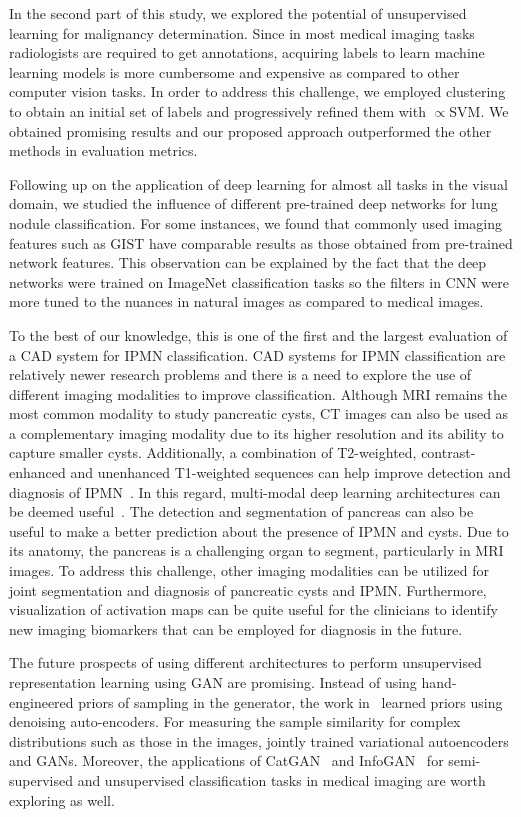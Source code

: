 \documentclass[journal]{IEEEtran}
\begin{document}
In the second part of this study, we explored the potential of unsupervised learning for malignancy determination. Since in most medical imaging tasks radiologists are required to get annotations, acquiring labels to learn machine learning models is more cumbersome and expensive as compared to other computer vision tasks. In order to address this challenge, we employed clustering to obtain an initial set of labels and progressively refined them with $\propto$SVM. We obtained promising results and our proposed approach outperformed the other methods in evaluation metrics.

Following up on the application of deep learning for almost all tasks in the visual domain, we studied the influence of different pre-trained deep networks for lung nodule classification. For some instances, we found that commonly used imaging features such as GIST have comparable results as those obtained from pre-trained network features. This observation can be explained by the fact that the deep networks were trained on ImageNet classification tasks so the filters in CNN were more tuned to the nuances in natural images as compared to medical images.

To the best of our knowledge, this is one of the first and the largest evaluation of a CAD system for IPMN classification. CAD systems for IPMN classification are relatively newer research problems and there is a need to explore the use of different imaging modalities to improve classification. Although MRI remains the most common modality to study pancreatic cysts, CT images can also be used as a complementary imaging modality due to its higher resolution and its ability to capture smaller cysts. Additionally, a combination of T2-weighted, contrast-enhanced and unenhanced T1-weighted sequences can help improve detection and diagnosis of IPMN~\cite{kalb2009mr}. In this regard, multi-modal deep learning architectures can be deemed useful~\cite{ma2015multimodal}.
The detection and segmentation of pancreas can also be useful to make a better prediction about the presence of IPMN and cysts. Due to its anatomy, the pancreas is a challenging
organ to segment, particularly in MRI images. To address this challenge, other imaging modalities can be utilized for joint segmentation and diagnosis of pancreatic cysts and IPMN. Furthermore, visualization of activation maps can be quite useful for the clinicians to identify new imaging biomarkers that can be employed for diagnosis in the future.

The future prospects of using different architectures to perform unsupervised representation learning using GAN are promising. Instead of using hand-engineered priors of sampling in the generator, the work in~\cite{nguyen2016plug} learned priors using denoising auto-encoders. For measuring the sample similarity for complex distributions such as those in the images, \cite{larsen2016autoencoding} jointly trained variational autoencoders and GANs. Moreover, the applications of CatGAN~\cite{springenberg2015unsupervised} and InfoGAN~\cite{chen2016infogan} for semi-supervised and unsupervised classification tasks in medical imaging are worth exploring as well.
\end{document}
